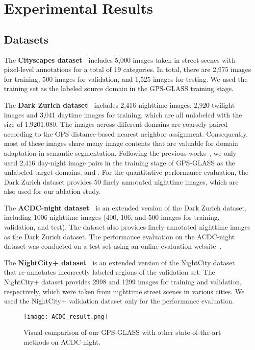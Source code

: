 \documentclass[10pt,twocolumn,letterpaper]{article}
\begin{document}
\section{Experimental Results}
\subsection{Datasets}
The \textbf{Cityscapes dataset~\cite{Cordts2016Cityscapes}} includes 5,000 images taken in street scenes with pixel-level annotations for a total of 19 categories.  In total, there are 2,975 images for training, 500 images for validation, and 1,525 images for testing. We used the training set as the labeled source domain  in the GPS-GLASS training stage. 

\noindent The \textbf{Dark Zurich dataset~\cite{sakaridis2019guided}} includes 2,416 nighttime images, 2,920 twilight images and 3,041 daytime images for training, which are all unlabeled with the size of 1,9201,080. The images across different domains are coarsely paired according to the GPS distance-based nearest neighbor assignment. Consequently, most of these images share many image contents that are valuable for domain adaptation in semantic segmentation. Following the previous works~\cite{wu2021dannet,xu2021cdada}, we only used 2,416 day-night image pairs in the training stage of GPS-GLASS as the unlabeled target domains,  and . For the quantitative performance evaluation, the Dark Zurich dataset provides 50 finely annotated nighttime images, which are also used for our ablation study. 

\noindent The \textbf{ACDC-night dataset~\cite{sakaridis2021acdc}} is an extended version of the Dark Zurich dataset, including 1006 nighttime images (400, 106, and 500 images for training, validation, and test). The dataset also provides finely annotated nighttime images as the Dark Zurich dataset. The performance evaluation on the ACDC-night dataset was conducted on a test set using an online evaluation website~\cite{acdcweb}.

\noindent The \textbf{NightCity+ dataset~\cite{deng2022nightlab}} is an extended version of the NightCity dataset~\cite{tan2021night} that re-annotates incorrectly labeled regions of the validation set. The NightCity+ dataset provides 2998 and 1299 images for training and validation, respectively, which were taken from nighttime street scenes in various cities. We used the NightCity+ validation dataset only for the performance evaluation.

\begin{figure}[t]
  \centering
  \texttt{[image: ACDC\_result.png]}
  \caption{Visual comparison of our GPS-GLASS with other state-of-the-art methods on ACDC-night.}
  \label{figure:acdc_result}
\end{figure}
\end{document}
